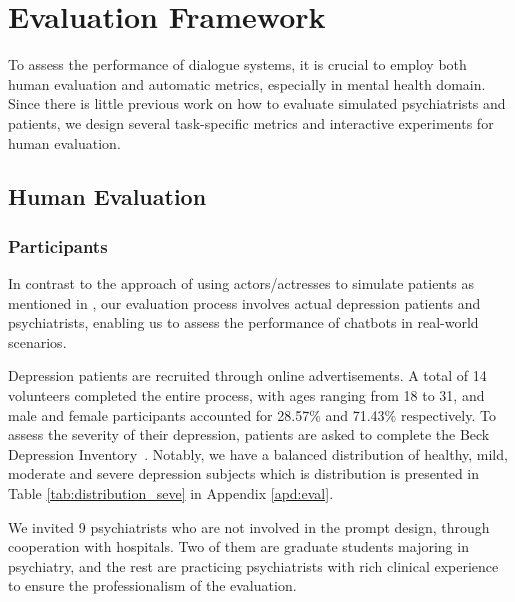 \section{Evaluation Framework}
\label{sec:eval_frameworks}

To assess the performance of dialogue systems, it is crucial to employ both human evaluation and automatic metrics, especially in mental health domain. Since there is little previous work on how to evaluate simulated psychiatrists and patients, we design several task-specific metrics and interactive experiments for human evaluation. 

\subsection{Human Evaluation}
\subsubsection{Participants}
In contrast to the approach of using actors/actresses to simulate patients as mentioned in \citet{yao-etal-2022-d4}, our evaluation process involves actual depression patients and psychiatrists, enabling us to assess the performance of chatbots in real-world scenarios.

Depression patients are recruited through online advertisements.
A total of 14 volunteers completed the entire process, with ages ranging from 18 to 31, and male and female participants accounted for 28.57\% and 71.43\% respectively. 
To assess the severity of their depression, patients are asked to complete the Beck Depression Inventory~\cite{beck1996beck}. Notably, we have a balanced distribution of healthy, mild, moderate and severe depression subjects which is distribution is presented in Table \ref{tab:distribution_seve} in Appendix \ref{apd:eval}.

We invited 9 psychiatrists who are not involved in the prompt design, through cooperation with hospitals. Two of them are graduate students majoring in psychiatry, and the rest are practicing psychiatrists with rich clinical experience to ensure the professionalism of the evaluation.

